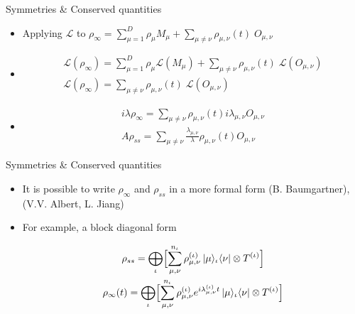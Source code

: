 \documentclass[10pt,xcolor={table,dvipsnames},t]{beamer}
\newcommand{\outerprodd}[3]{\ket{#1}\!_{#2}\!\bra{#3}}
\begin{document}
\begin{frame}{Symmetries \& Conserved quantities}
  \begin{itemize}
    \item<1-> Applying $\mathcal{L}$ to $\rho_\infty = \sum_{\mu=1}^D \rho_\mu M_\mu
     +  \sum_{\mu \neq \nu} \rho_{\mu, \nu}(t)\; O_{\mu, \nu}$
   \item<2->[]
     \begin{center}
       \begin{gather*}
         \mathcal{L}(\rho_\infty) = \sum_{\mu=1}^D \rho_\mu \mathcal{L}(M_\mu)
         +  \sum_{\mu \neq \nu} \rho_{\mu, \nu}(t)\; \mathcal{L}(O_{\mu, \nu}) \\
      \mathcal{L}(\rho_\infty) = \sum_{\mu \neq \nu} \rho_{\mu, \nu}(t)\; \mathcal{L}(O_{\mu, \nu})
       \end{gather*}
     \end{center}
   \item<3->[]
     \begin{center}
       \begin{gather*}
         i \lambda \rho_{\infty} = \sum_{\mu \neq \nu} \rho_{\mu, \nu}(t) i \lambda_{\mu, \nu} O_{\mu, \nu} \\
         A\rho_{ss} = \sum_{\mu \neq \nu} \frac{\lambda_{\mu, \nu}}{\lambda} \rho_{\mu, \nu}(t)  O_{\mu, \nu}
       \end{gather*}
     \end{center}
  \end{itemize}
\end{frame}

\begin{frame}{Symmetries \& Conserved quantities}
  \begin{itemize}
    \item<1-> It is possible to write $\rho_\infty$ and $\rho_{ss}$ in a more formal form (B. Baumgartner), 
      (V.V. Albert, L. Jiang)
    \item<1-> For example, a block diagonal form
      \begin{center}
        \begin{gather*}
          \rho_{ss} = \bigoplus_\iota \Bigl[ \sum_{\mu, \nu}^{n_\iota} \rho_{\mu, \nu}^{(\iota)}
            \outerprodd{\mu}{\iota}{\nu} \otimes T^{(\iota)}
          \Bigr] \\
          \rho_{\infty}(t) = \bigoplus_\iota \Bigl[
            \sum_{\mu, \nu}^{n_\iota} \rho_{\mu, \nu}^{(\iota)} e^{i\lambda_{\mu, \nu}^{(\iota)} t} \outerprodd{\mu}{\iota}{\nu}
            \otimes T^{(\iota)}
          \Bigr]
        \end{gather*}
      \end{center}
  \end{itemize}
\end{frame}
\end{document}

